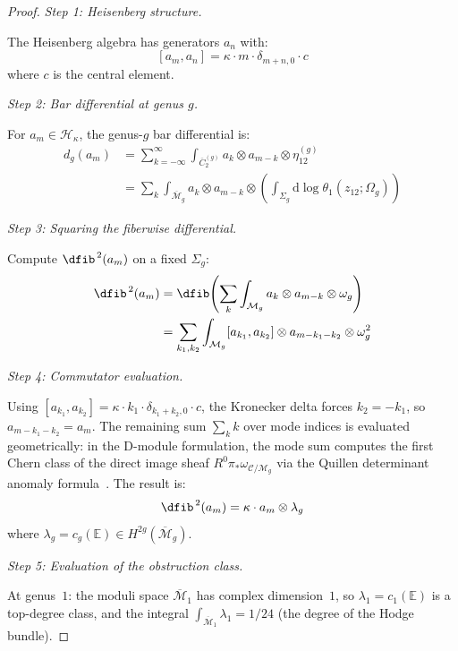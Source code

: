 \begin{proof}

\emph{Step 1: Heisenberg structure.}

The Heisenberg algebra has generators $a_n$ with:
\[[a_m, a_n] = \kappa \cdot m \cdot \delta_{m+n,0} \cdot c\]
where $c$ is the central element.

\emph{Step 2: Bar differential at genus $g$.}

For $a_m \in \mathcal{H}_\kappa$, the genus-$g$ bar differential is:
\begin{align}
d_g(a_m) &= \sum_{k=-\infty}^{\infty} \int_{\overline{C}_2^{(g)}} a_k \otimes a_{m-k} 
\otimes \eta_{12}^{(g)} \\
&= \sum_{k} \int_{\overline{\mathcal{M}}_g} a_k \otimes a_{m-k} \otimes 
\left(\int_{\Sigma_g} \text{d}\log\theta_1(z_{12}; \Omega_g)\right)
\end{align}

\emph{Step 3: Squaring the fiberwise differential.}

Compute $\dfib^{\,2}(a_m)$ on a fixed $\Sigma_g$:
\begin{align}
\dfib^{\,2}(a_m) &= \dfib\!\left(\sum_k \int_{\mathcal{M}_g} a_k \otimes a_{m-k} \otimes \omega_g\right) \\
&= \sum_{k_1, k_2} \int_{\mathcal{M}_g} [a_{k_1}, a_{k_2}] \otimes a_{m-k_1-k_2}
\otimes \omega_g^2
\end{align}

\emph{Step 4: Commutator evaluation.}

Using $[a_{k_1}, a_{k_2}] = \kappa \cdot k_1 \cdot \delta_{k_1 + k_2, 0} \cdot c$,
the Kronecker delta forces $k_2 = -k_1$, so
$a_{m - k_1 - k_2} = a_m$.  The remaining sum
$\sum_{k} k$ over mode indices is evaluated geometrically:
in the D-module formulation, the mode sum computes the
first Chern class of the direct image sheaf $R^0\pi_*\omega_{\mathcal{C}/\mathcal{M}_g}$
via the Quillen determinant anomaly formula~\cite{Quillen85}.  The result is:
\begin{equation}
\dfib^{\,2}(a_m) = \kappa \cdot a_m \otimes \lambda_g
\end{equation}
where $\lambda_g = c_g(\mathbb{E}) \in H^{2g}(\overline{\mathcal{M}}_g)$.

\emph{Step 5: Evaluation of the obstruction class.}

At genus~$1$: the moduli space $\overline{\mathcal{M}}_1$ has complex dimension~$1$, so $\lambda_1 = c_1(\mathbb{E})$ is a top-degree class, and the integral $\int_{\overline{\mathcal{M}}_1} \lambda_1 = 1/24$ (the degree of the Hodge bundle).


\end{proof}
